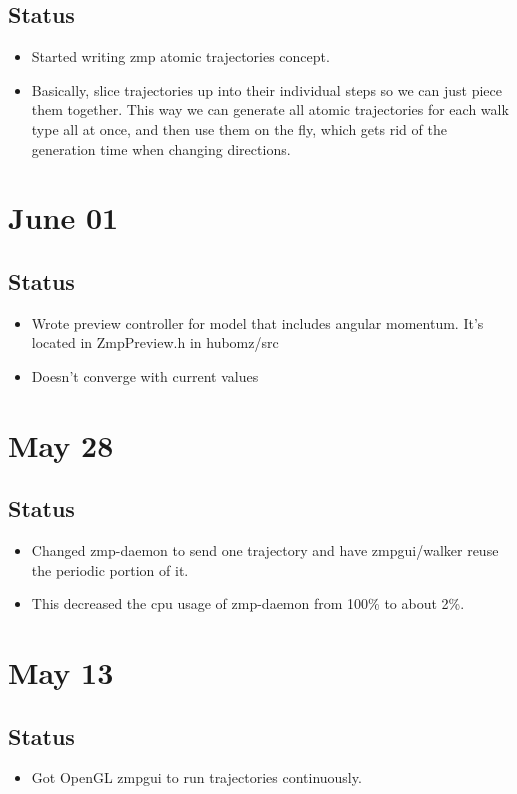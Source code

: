 \documentclass[letterpaper, 10 pt]{report}
\begin{document}
\subsection*{Status}
\begin{itemize}
\item Started writing zmp atomic trajectories concept.
\item Basically, slice trajectories up into their individual steps so we can just piece them together. This way we can generate all atomic trajectories for each walk type all at once, and then use them on the fly, which gets rid of the generation time when changing directions.
\end{itemize}

\section*{June 01}
\subsection*{Status}
\begin{itemize}
\item Wrote preview controller for model that includes angular momentum. It's located in ZmpPreview.h in hubomz/src
\item Doesn't converge with current values
\end{itemize}

\section*{May 28}
\subsection*{Status}
\begin{itemize}
\item Changed zmp-daemon to send one trajectory and have zmpgui/walker reuse the periodic portion of it.
\item This decreased the cpu usage of zmp-daemon from 100\% to about 2\%.
\end{itemize}

\section*{May 13}
\subsection*{Status}
\begin{itemize}
\item Got OpenGL zmpgui to run trajectories continuously.
\end{itemize}
\end{document}
